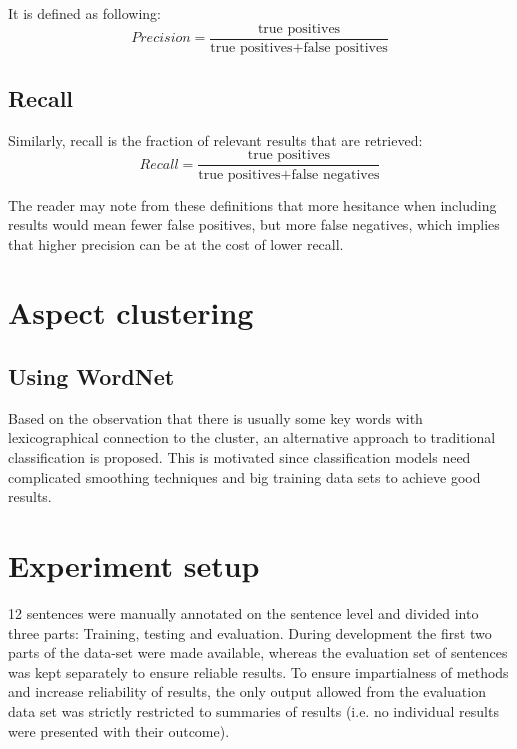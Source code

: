 \documentclass[a4paper,11pt]{kth-mag}
\newcommand{\numAnnotated}{12 }
\newif\ifhasStudiedFailures
\begin{document}
It is defined as following:
$$Precision = \frac{\text {true positives}}{\text{true positives} + \text{false positives}}$$

\subsection{Recall}
Similarly, recall is the fraction of relevant results that are retrieved:
$$Recall = \frac{\text {true positives}}{\text{true positives} + \text{false negatives}}$$

The reader may note from these definitions that more hesitance when including results would mean fewer false positives, but more false negatives, which implies that higher precision can be at the cost of lower recall.


\section{Aspect clustering}
\subsection{Using WordNet}
Based on the observation that there is usually some key words with lexicographical connection to the cluster, an alternative approach to traditional classification is proposed. This is motivated since classification models need complicated smoothing techniques and big training data sets to achieve good results.



\section{Experiment setup}
\numAnnotated sentences were manually annotated on the sentence level and divided into three parts: Training, testing and evaluation. During development the first two parts of the data-set were made available, whereas the evaluation set of sentences was kept separately to ensure reliable results. To ensure impartialness of methods and increase reliability of results, the only output allowed from the evaluation data set was strictly restricted to summaries of results (i.e. no individual results were presented with their outcome)\ifhasStudiedFailures, except for when failing instances were explicitly studied after method development was finished\fi.


\end{document}
